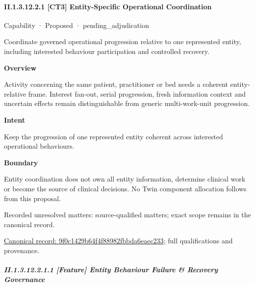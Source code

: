 \paragraph*{II.1.3.12.2.1 [CT3] Entity-Specific Operational Coordination}
\label{navigation:II.1.3.12.2.1}

\label{element:9f0c1429b64f4f88982fbbda6eaec233}
{\small Capability · Proposed · pending\_adjudication}\par

Coordinate governed operational progression relative to one represented entity, including interested behaviour participation and controlled recovery.



\textbf{Overview}



Activity concerning the same patient, practitioner or bed needs a coherent entity-relative frame. Interest fan-out, serial progression, fresh information context and uncertain effects remain distinguishable from generic multi-work-unit progression.



\textbf{Intent}



Keep the progression of one represented entity coherent across interested operational behaviours.



\textbf{Boundary}



Entity coordination does not own all entity information, determine clinical work or become the source of clinical decisions. No Twin component allocation follows from this proposal.


{\small Recorded unresolved matters: source-qualified matters; exact scope remains in the canonical record.}\par
{\footnotesize \href{../../../../continuum/strategy/capability/9f0c1429b64f4f88982fbbda6eaec233.md}{Canonical record: 9f0c1429b64f4f88982fbbda6eaec233}; full qualifications and provenance.}\par
\subparagraph*{II.1.3.12.2.1.1 [Feature] Entity Behaviour Failure \& Recovery Governance}
\label{navigation:II.1.3.12.2.1.1}

